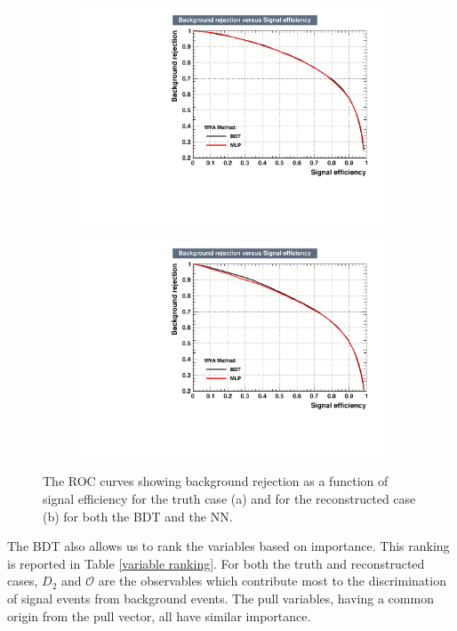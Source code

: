 \documentclass[10pt,a4paper]{book}
\begin{document}
\begin{figure}[h]
\begin{subfigure}{1.0\textwidth}
\centering
\includegraphics[scale=0.7]{ch4_images/ROC_truth}
\caption{}
\end{subfigure}
\begin{subfigure}{1.0\textwidth}
\centering
\includegraphics[scale=0.7]{ch4_images/ROC_reco}
\caption{}
\end{subfigure}
\caption{The ROC curves showing background rejection as a function of signal efficiency for the truth case (a) and for the reconstructed case (b) for both the BDT and the NN.}
\label{ROC curves}
\end{figure} 

The BDT also allows us to rank the variables based on importance. This ranking is reported in Table \ref{variable ranking}. For both the truth and reconstructed cases, $D_2$ and $\mathcal{O}$ are the observables which contribute most to the discrimination of signal events from background events. The pull variables, having a common origin from the pull vector, all have similar importance.
\end{document}
